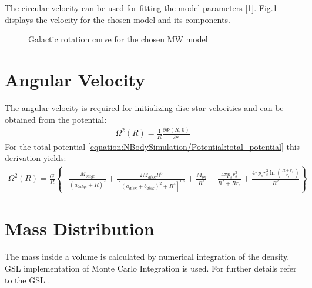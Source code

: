 \documentclass[letterpaper,10pt,english]{sphinxmanual}
\begin{document}
\sphinxAtStartPar
The circular velocity can be used for fitting the model parameters {[}\hyperlink{cite.NBodySimulation/Appendix:id60}{1}{]}.
\hyperref[\detokenize{NBodySimulation/Potential:fig-potential-circular-velocity}]{Fig.\@ \ref{\detokenize{NBodySimulation/Potential:fig-potential-circular-velocity}}} displays the velocity for the chosen model and its components.

\begin{figure}[htbp]
\centering
\capstart

\noindent{}
\caption{Galactic rotation curve for the chosen MW model}\label{\detokenize{NBodySimulation/Potential:id9}}\label{\detokenize{NBodySimulation/Potential:fig-potential-circular-velocity}}\end{figure}


\section{Angular Velocity}
\label{\detokenize{NBodySimulation/Potential:angular-velocity}}
\sphinxAtStartPar
The angular velocity is required for initializing disc star velocities and can be obtained from the potential:
\begin{equation*}
\begin{split}\Omega ^{2}\left ( R \right ) = \frac{1}{R}\frac{\partial \Phi \left ( R,0 \right )}{\partial r}\end{split}
\end{equation*}
\sphinxAtStartPar
For the total potential \eqref{equation:NBodySimulation/Potential:total_potential} this derivation yields:
\begin{equation*}
\begin{split}\Omega ^{2}\left ( R \right ) = \frac{G}{R} \left\{-\frac{M_{bulge}}{(a_{bulge}+R)^2}+\frac{2 M_{disk} R^3}{\left[\left(a_{disk}+b_{disk}\right)^2+R^4\right]^{1.5}}+\frac{M_{bh}}{R^2}-\frac{4 \pi  p_{s} r_{s}^3}{R^2+R r_{s}}+\frac{4 \pi  p_{s} r_{s}^3 \ln \left(\frac{R+r_{s}}{r_{s}}\right)}{R^2}\right\}\end{split}
\end{equation*}

\section{Mass Distribution}
\label{\detokenize{NBodySimulation/Potential:mass-distribution}}
\sphinxAtStartPar
The mass inside a volume is calculated by numerical integration of the density.
GSL implementation of Monte Carlo Integration is used. For further details refer to the GSL .
\end{document}
